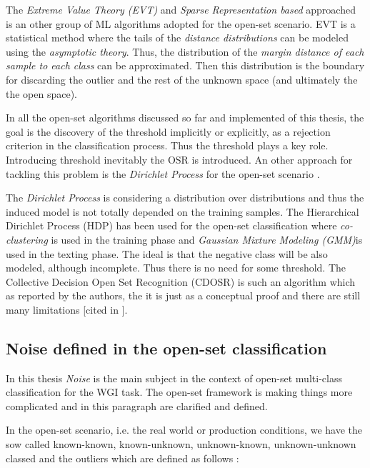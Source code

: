 The \textit{Extreme Value Theory (EVT)} and \textit{Sparse Representation based} approached is an other group of ML algorithms adopted for the open-set scenario. EVT is a statistical method where the tails of the \textit{distance distributions} can be modeled using the \textit{asymptotic theory}. Thus, the distribution of the \textit{margin distance of each sample to each class} can be approximated. Then this distribution is the boundary for discarding the outlier and the rest of the unknown space (and ultimately the the open space).

In all the open-set algorithms discussed so far and implemented of this thesis, the goal is the discovery of the threshold implicitly or explicitly, as a rejection criterion in the classification process. Thus the threshold plays a key role. Introducing threshold inevitably the OSR is introduced. An other approach for tackling this problem is the \textit{Dirichlet Process} for the open-set scenario \parencite{geng2018recent}.

The \textit{Dirichlet Process} is considering a distribution over distributions and thus the induced model is not totally depended on the training samples. The Hierarchical Dirichlet Process (HDP) has been used for the open-set classification where \textit{co-clustering} is used in the training phase and \textit{Gaussian Mixture Modeling (GMM)}is used in the texting phase. The ideal is that the negative class will be also modeled, although incomplete. Thus there is no need for some threshold. The Collective Decision Open Set Recognition (CDOSR) is such an algorithm which as reported by the authors, the it is just as a conceptual proof and there are still many limitations \parencite{geng2018collective} [cited in \parencite{geng2018recent}].


\subsection{Noise defined in the open-set classification}\label{chap:openset:sec:Noise_definition}

In this thesis \textit{Noise} is the main subject in the context of open-set multi-class classification for the WGI task. The open-set framework is making things more complicated and in this paragraph are clarified and defined. 

In the open-set scenario, i.e. the real world or production conditions, we have the sow called known-known, known-unknown, unknown-known, unknown-unknown classed and the outliers  which are defined as follows \parencite{geng2018recent}:

